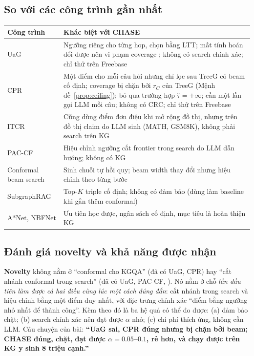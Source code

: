 \documentclass[11pt,a4paper]{article}
\theoremstyle{remark}
\newcommand{\tauhat}{\hat{\tau}}
\newcommand{\method}{\textsc{CHASE}}
\begin{document}
\subsection{So với các công trình gần nhất}
\begin{center}
\small
\begin{tabularx}{\linewidth}{>{\raggedright\arraybackslash}p{3.2cm} >{\raggedright\arraybackslash}X}
\toprule
Công trình & Khác biệt với \method \\
\midrule
UaG \cite{uag} & Ngưỡng riêng cho từng hop, chọn bằng LTT; mất tính hoán đổi được nên vi phạm coverage \cite{cpr}; không có search chính xác; chỉ thử trên Freebase \\
CPR \cite{cpr} & Một điểm cho mỗi câu hỏi nhưng chỉ lọc sau TreeG có beam cố định; coverage bị chặn bởi $r_C$ của TreeG (Mệnh đề~\ref{prop:ceiling}); bỏ qua trường hợp $\tauhat=+\infty$; cần một lần gọi LLM mỗi câu; không có CRC; chỉ thử trên Freebase \\
ITCR \cite{itcr} & Cũng dùng điểm đơn điệu khi mở rộng đồ thị, nhưng trên đồ thị claim do LLM sinh (MATH, GSM8K), không phải search trên KG \\
PAC-CF \cite{pacf} & Hiệu chỉnh ngưỡng cắt frontier trong search do LLM dẫn hướng; không có KG \\
Conformal beam search \cite{confbeam} & Sinh chuỗi tự hồi quy; beam width thay đổi nhưng hiệu chỉnh theo từng bước \\
SubgraphRAG \cite{subgraphrag} & Top-$K$ triple cố định; không có đảm bảo (dùng làm baseline khi gắn thêm conformal) \\
A*Net, NBFNet \cite{astarnet,nbfnet} & Ưu tiên học được, ngân sách cố định, mục tiêu là hoàn thiện KG \\
\bottomrule
\end{tabularx}
\end{center}

\subsection{Đánh giá novelty và khả năng được nhận}
\textbf{Novelty} không nằm ở ``conformal cho KGQA'' (đã có UaG, CPR) hay ``cắt nhánh conformal trong search'' (đã có UaG, PAC-CF, \cite{confbeam}). Nó nằm ở chỗ \emph{lần đầu tiên làm được cả hai điều cùng lúc một cách đúng đắn}: cắt nhánh trong search và hiệu chỉnh bằng một điểm duy nhất, với đặc trưng chính xác ``điểm bằng ngưỡng nhỏ nhất để thành công''. Kèm theo đó là ba hệ quả có thể đo được: (a) đảm bảo chặt; (b) search chính xác nên đạt được $\alpha$ nhỏ; (c) chi phí thích ứng, không cần LLM. Câu chuyện của bài: \textbf{``UaG sai, CPR đúng nhưng bị chặn bởi beam; \method{} đúng, chặt, đạt được $\alpha=0.05$--$0.1$, rẻ hơn, và chạy được trên KG y sinh 8 triệu cạnh.''}
\end{document}
